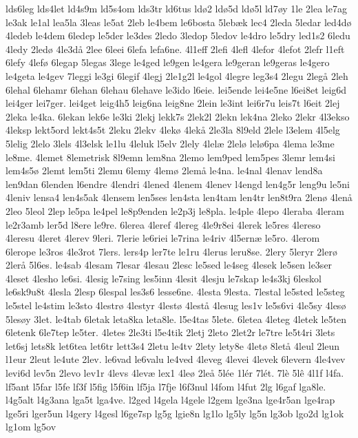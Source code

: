 {lds6leg
lds4let
ld4s9m
ld5s4om
lds3tr
ld6tus
ldø2
ldø5d
ldø5l
ld7øy
1le
2lea
le7ag
le3ak
le1al
lea5la
3leas
le5at
2leb
le4bem
le6bosta
5lebæk
lec4
2leda
5ledar
led4dø
4ledeb
le4dem
6ledep
le5der
le3des
2ledo
3ledop
5ledov
le4dro
le5dry
led1s2
6ledu
4ledy
2ledø
4le3då
2lee
6leei
6lefa
lefa6ne.
4l1eff
2lefi
4lefl
4lefor
4lefot
2lefr
l1eft
6lefy
4lefø
6legap
5legas
3lege
le4ged
le9gen
le4gera
le9geran
le9geras
le4gero
le4geta
le4gev
7leggi
le3gi
6legif
4legj
2le1g2l
le4gol
4legre
leg3s4
2legu
2legå
2leh
6lehal
6lehamr
6lehan
6lehau
6lehave
le3ido
l6eie.
lei5ende
lei4e5ne
l6ei8et
leig6d
lei4ger
lei7ger.
lei4get
leig4h5
leig6na
leig8ne
2lein
le3int
lei6r7u
leis7t
l6eit
2lej
2leka
le4ka.
6lekan
lek6e
le3ki
2lekj
lekk7s
2lek2l
2lekn
lek4na
2leko
2lekr
4l3ekso
4leksp
lekt5ord
lekt4s5t
2leku
2lekv
4lekø
4lekå
2le3la
8l9eld
2lele
l3elem
4l5elg
5lelig
2lelo
3lels
4l3elsk
le1lu
4leluk
l5elv
2lely
4lelæ
2lelø
lelø6pa
4lema
le3me
le8me.
4lemet
8lemetrisk
8l9emn
lem8na
2lemo
lem9ped
lem5pes
3lemr
lem4si
lem4s5ø
2lemt
lem5ti
2lemu
6lemy
4lemø
2lemå
le4na.
le4nal
4lenav
lend8a
len9dan
6lenden
l6endre
4lendri
4lened
4lenem
4lenev
l4engd
len4g5r
leng9u
le5ni
4leniv
lensa4
len4s5ak
4lensem
len5ses
len4sta
len4tam
len4tr
len8t9ra
2lenø
4lenå
2leo
5leol
2lep
le5pa
le4pel
le8p9enden
le2p3j
le8pla.
le4ple
4lepo
4leraba
4leram
le2r3amb
ler5d
l8ere
le9re.
6lerea
4leref
4lereg
4le9r8ei
4lerek
le5res
4lereso
4leresu
4leret
4lerev
9leri.
7lerie
le6riei
le7rina
le4riv
4l5ernæ
le5ro.
4lerom
6lerope
le3ros
4le3rot
7lers.
lers4p
ler7te
le1ru
4lerus
leru8se.
2lery
5leryr
2lerø
2lerå
5l6es.
le4sab
4lesam
7lesar
4lesau
2lesc
le5sed
le4seg
4lesek
le5sen
le3ser
4leset
4lesho
le6si.
4lesig
le7sing
les5inn
4lesit
4lesju
le7skap
le4s3kj
6leskol
le6sk9u8t
4lesla
2lesp
6lespal
les3s6
lesse6ne.
4lesta
9lesta.
7lestal
le5sted
le5steg
le5stel
le4stim
le3sto
4lestrø
4lestyr
4lestø
4lestå
4lesug
les1v
le5s6vi
4le5sy
4lesø
5lesøy
3let.
le4tab
6letak
leta8ka
leta8le.
l5e4tas
5lete.
6letea
4leteg
4letek
le5ten
6letenk
6le7tep
le5ter.
4letes
2le3ti
l5e4tik
2letj
2leto
2let2r
le7tre
le5t4ri
3lets
let6sj
lets8k
let6tea
let6tr
lett3s4
2letu
le4tv
2lety
lety8e
4letø
8letå
4leul
2leun
l1eur
2leut
le4ute
2lev.
le6vad
le6valu
le4ved
4leveg
4levei
4levek
6levern
4le4vev
levi6d
lev5n
2levo
lev1r
4levs
4levæ
lex1
4leø
2leå
5lée
1lér
7lét.
7lè
5lê
4l1f
l4fa.
lf5ant
l5far
l5fe
lf3f
l5fig
l5f6in
lf5ja
l7fje
l6f3nul
l4fom
l4fut
2lg
l6gaf
lga8le.
l4g5alt
l4g3ana
lga5t
lga4ve.
l2ged
l4gela
l4gele
l2gem
lge3na
lge4r5an
lge4rap
lge5ri
lger5un
l4gery
l4gesl
l6ge7sp
lg5g
lgie8n
lg1lo
lg5ly
lg5n
lg3ob
lgo2d
lg1ok
lg1om
lg5ov
}
